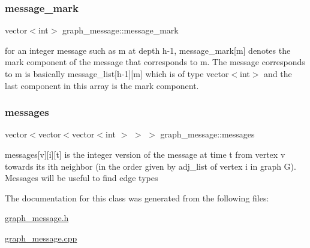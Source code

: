 \mbox{\label{classgraph__message_a49d9af5150daf0599c29fe18cb032fa5}} 
\subsubsection{\texorpdfstring{message\+\_\+mark}{message\_mark}}
{\footnotesize\ttfamily vector$<$int$>$ graph\+\_\+message\+::message\+\_\+mark}



for an integer message such as m at depth h-\/1, message\+\_\+mark\mbox{[}m\mbox{]} denotes the mark component of the message that corresponds to m. The message corresponds to m is basically message\+\_\+list\mbox{[}h-\/1\mbox{]}\mbox{[}m\mbox{]} which is of type vector$<$int$>$ and the last component in this array is the mark component. 

\mbox{\label{classgraph__message_aac77e098f0acf9650116a8e51fe3b4b7}} 
\subsubsection{\texorpdfstring{messages}{messages}}
{\footnotesize\ttfamily vector$<$vector$<$vector$<$int $>$ $>$ $>$ graph\+\_\+message\+::messages}



messages\mbox{[}v\mbox{]}\mbox{[}i\mbox{]}\mbox{[}t\mbox{]} is the integer version of the message at time t from vertex v towards its ith neighbor (in the order given by adj\+\_\+list of vertex i in graph G). Messages will be useful to find edge types 



The documentation for this class was generated from the following files\+:\begin{DoxyCompactItemize}
\item 
\hyperlink{graph__message_8h}{graph\+\_\+message.\+h}\item 
\hyperlink{graph__message_8cpp}{graph\+\_\+message.\+cpp}\end{DoxyCompactItemize}
